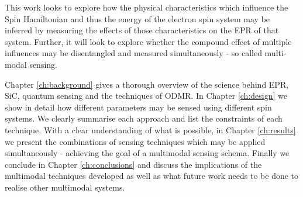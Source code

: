 %
%
%
%

This work looks to explore how the physical characteristics which influence the Spin Hamiltonian and thus the energy of the electron spin system may be inferred by measuring the effects of those characteristics on the EPR of that system. Further, it will look to explore whether the compound effect of multiple influences may be disentangled and measured simultaneously - so called multi-modal sensing.

Chapter \ref{ch:background} gives a thorough overview of the science behind EPR, SiC, quantum sensing and the techniques of ODMR. 
In Chapter \ref{ch:design} we show in detail how different parameters may be sensed using different spin systems. We clearly summarise each approach and list the constraints of each technique. With a clear understanding of what is possible, in Chapter \ref{ch:results} we present the combinations of sensing techniques which may be applied simultaneously - achieving the goal of a multimodal sensing schema. Finally we conclude in Chapter \ref{ch:conclusions} and discuss the implications of the multimodal techniques developed as well as what future work needs to be done to realise other multimodal systems.  


